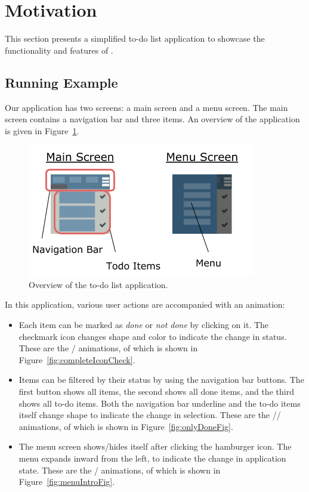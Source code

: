 \section{Motivation}
\label{sec:motivation}

This section presents a simplified to-do list application to showcase the
functionality and features of \dsl{}.

\subsection{Running Example}

Our application has two screens: a main screen and a menu screen. The main
screen contains a navigation bar and three items. An overview of the
application is given in Figure~\ref{fig:appOverview}.

\begin{figure}[!htbp]
\centering
\includegraphics[width=\figscale\textwidth]{pictures/app_overview}
\caption{Overview of the to-do list application.}
\label{fig:appOverview}
\end{figure}

In this application, various user actions are accompanied with an animation:
\begin{itemize}
\item Each item can be marked as \emph{done} or \emph{not done} by clicking on it. The
checkmark icon changes shape and color to indicate the change in status. These
are the / animations, of which  is
shown in Figure~\ref{fig:completeIconCheck}.
\item Items can be filtered by their status by using the navigation bar
buttons. The first button shows all items, the second shows all done items, and
the third shows all to-do items. Both the navigation bar underline and the
to-do items itself change shape to indicate the change in selection. These are
the // animations, of which
 is shown in Figure~\ref{fig:onlyDoneFig}.
\item The menu screen shows/hides itself after clicking the hamburger icon. The
menu expands inward from the left, to indicate the change in application state.
These are the / animations, of which 
is shown in Figure~\ref{fig:menuIntroFig}.
\end{itemize}


